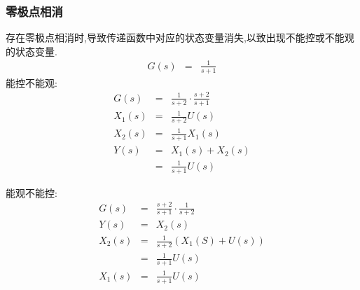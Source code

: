 \documentclass{article}
\begin{document}
\begin{frame}
\frametitle{零极点相消}
\label{sec-3-1-3}

存在零极点相消时,导致传递函数中对应的状态变量消失,以致出现不能控或不能观的状态变量.
\begin{eqnarray*}
G(s)&= &\frac{1}{s+1} 
\end{eqnarray*}
能控不能观:
\begin{eqnarray*}
G(s) &=& \frac{1}{s+2}\cdot\frac{s+2}{s+1}\\
X_1(s) &=& \frac{1}{s+2}U(s)\\
X_2(s) &=& \frac{1}{s+1}X_1(s)\\
Y(s) &= & X_1(s)+X_2(s) \\
     &=& \frac{1}{s+1}U(s)
\end{eqnarray*}


能观不能控:
\begin{eqnarray*}
G(s) &=& \frac{s+2}{s+1}\cdot\frac{1}{s+2}\\
Y(s) &= &X_2(s)\\
X_2(s) &=& \frac{1}{s+2}(X_1(S)+U(s))\\
       &=& \frac{1}{s+1}U(s)\\
X_1(s) &=& \frac{1}{s+1}U(s)
\end{eqnarray*}

\end{frame}
\end{document}
